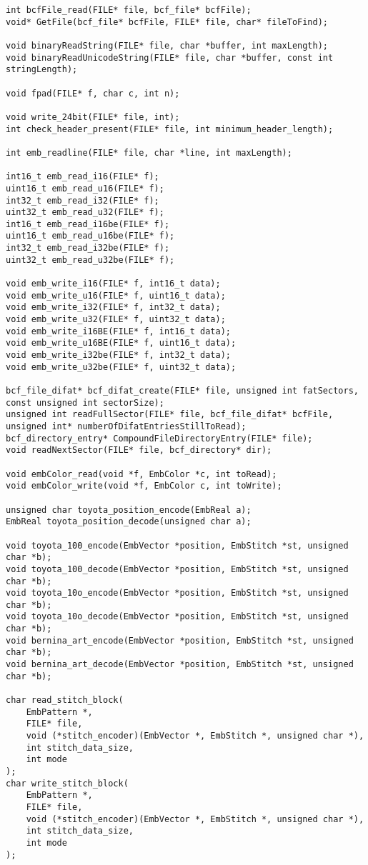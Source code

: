 \begin{lstlisting}
int bcfFile_read(FILE* file, bcf_file* bcfFile);
void* GetFile(bcf_file* bcfFile, FILE* file, char* fileToFind);

void binaryReadString(FILE* file, char *buffer, int maxLength);
void binaryReadUnicodeString(FILE* file, char *buffer, const int stringLength);

void fpad(FILE* f, char c, int n);

void write_24bit(FILE* file, int);
int check_header_present(FILE* file, int minimum_header_length);

int emb_readline(FILE* file, char *line, int maxLength);

int16_t emb_read_i16(FILE* f);
uint16_t emb_read_u16(FILE* f);
int32_t emb_read_i32(FILE* f);
uint32_t emb_read_u32(FILE* f);
int16_t emb_read_i16be(FILE* f);
uint16_t emb_read_u16be(FILE* f);
int32_t emb_read_i32be(FILE* f);
uint32_t emb_read_u32be(FILE* f);

void emb_write_i16(FILE* f, int16_t data);
void emb_write_u16(FILE* f, uint16_t data);
void emb_write_i32(FILE* f, int32_t data);
void emb_write_u32(FILE* f, uint32_t data);
void emb_write_i16BE(FILE* f, int16_t data);
void emb_write_u16BE(FILE* f, uint16_t data);
void emb_write_i32be(FILE* f, int32_t data);
void emb_write_u32be(FILE* f, uint32_t data);

bcf_file_difat* bcf_difat_create(FILE* file, unsigned int fatSectors, const unsigned int sectorSize);
unsigned int readFullSector(FILE* file, bcf_file_difat* bcfFile, unsigned int* numberOfDifatEntriesStillToRead);
bcf_directory_entry* CompoundFileDirectoryEntry(FILE* file);
void readNextSector(FILE* file, bcf_directory* dir);

void embColor_read(void *f, EmbColor *c, int toRead);
void embColor_write(void *f, EmbColor c, int toWrite);

unsigned char toyota_position_encode(EmbReal a);
EmbReal toyota_position_decode(unsigned char a);

void toyota_100_encode(EmbVector *position, EmbStitch *st, unsigned char *b);
void toyota_100_decode(EmbVector *position, EmbStitch *st, unsigned char *b);
void toyota_10o_encode(EmbVector *position, EmbStitch *st, unsigned char *b);
void toyota_10o_decode(EmbVector *position, EmbStitch *st, unsigned char *b);
void bernina_art_encode(EmbVector *position, EmbStitch *st, unsigned char *b);
void bernina_art_decode(EmbVector *position, EmbStitch *st, unsigned char *b);

char read_stitch_block(
    EmbPattern *,
    FILE* file,
    void (*stitch_encoder)(EmbVector *, EmbStitch *, unsigned char *),
    int stitch_data_size,
    int mode
);
char write_stitch_block(
    EmbPattern *,
    FILE* file,
    void (*stitch_encoder)(EmbVector *, EmbStitch *, unsigned char *),
    int stitch_data_size,
    int mode
);


\end{lstlisting}

